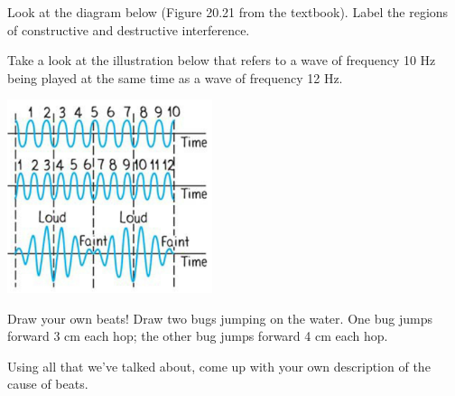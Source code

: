 \documentclass[10pt]{exam}
\begin{document}
\begin{questions}
\question
  Look at the diagram below (Figure 20.21 from the textbook).  Label the regions of constructive and destructive interference.


  \question
  Take a look at the illustration below that refers to a wave of frequency 10 Hz being played at the same time as a wave of frequency 12 Hz.

  \vspace{-1em}

  \begin{multicols}{2}
    \centering\includegraphics[width=6cm]{Figure.png}

  \end{multicols}
 
\question
  Draw your own beats!  Draw two bugs jumping on the water.  One bug jumps forward 3 cm each hop; the other bug jumps forward 4 cm each hop.



\question Using all that we've talked about, come up with your own description of the cause of beats. \vs



\end{questions}
\end{document}
